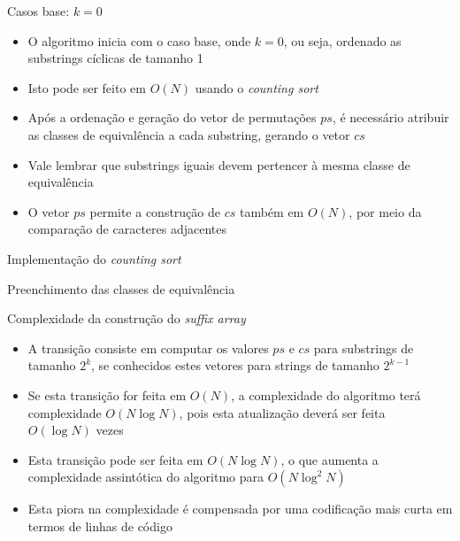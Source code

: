 \begin{frame}[fragile]{Casos base: $k = 0$}

    \begin{itemize}
        \item O algoritmo inicia com o caso base, onde $k = 0$, ou seja, ordenado as substrings
            cíclicas de tamanho 1

        \item Isto pode ser feito em $O(N)$ usando o \textit{counting sort}

        \item Após a ordenação e geração do vetor de permutações $ps$, é necessário atribuir
            as classes de equivalência a cada substring, gerando o vetor $cs$

        \item Vale lembrar que substrings iguais devem pertencer à mesma classe de
            equivalência

        \item O vetor $ps$ permite a construção de $cs$ também em $O(N)$, por meio da comparação
            de caracteres adjacentes
    \end{itemize}

\end{frame}

\begin{frame}[fragile]{Implementação do {\it counting sort}}
\end{frame}

\begin{frame}[fragile]{Preenchimento das classes de equivalência}
\end{frame}

\begin{frame}[fragile]{Complexidade da construção do {\it suffix array}}

    \begin{itemize}
        \item A transição consiste em computar os valores $ps$ e $cs$ para substrings de tamanho
            $2^k$, se conhecidos estes vetores para strings de tamanho $2^{k - 1}$

        \item Se esta  transição for feita em $O(N)$, a complexidade do algoritmo terá
            complexidade $O(N\log N)$, pois esta atualização deverá ser feita $O(\log N)$ vezes

        \item Esta transição pode ser feita em $O(N\log N)$, o que aumenta a complexidade 
            assintótica do algoritmo para $O(N\log^2 N)$

        \item Esta piora na complexidade é compensada por uma codificação mais curta em termos de 
            linhas de código

    \end{itemize}

\end{frame}

